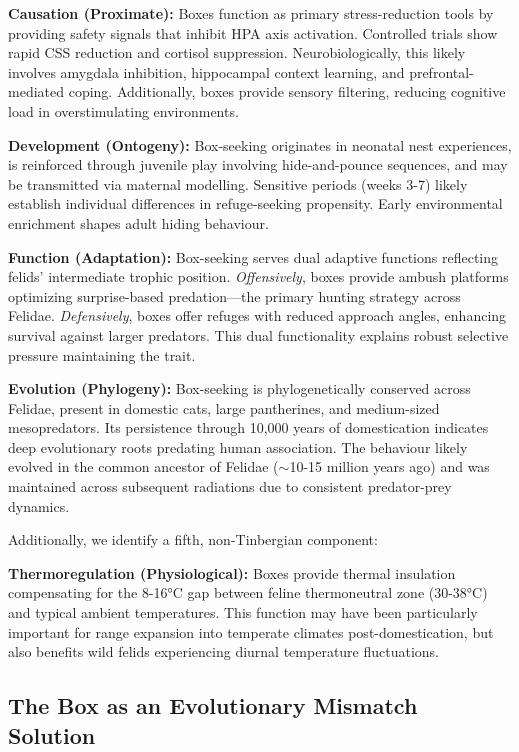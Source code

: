 \documentclass[12pt,a4paper]{article}
\begin{document}
\textbf{Causation (Proximate):} Boxes function as primary stress-reduction tools by providing safety signals that inhibit HPA axis activation. Controlled trials show rapid CSS reduction and cortisol suppression. Neurobiologically, this likely involves amygdala inhibition, hippocampal context learning, and prefrontal-mediated coping. Additionally, boxes provide sensory filtering, reducing cognitive load in overstimulating environments.

\textbf{Development (Ontogeny):} Box-seeking originates in neonatal nest experiences, is reinforced through juvenile play involving hide-and-pounce sequences, and may be transmitted via maternal modelling. Sensitive periods (weeks 3-7) likely establish individual differences in refuge-seeking propensity. Early environmental enrichment shapes adult hiding behaviour.

\textbf{Function (Adaptation):} Box-seeking serves dual adaptive functions reflecting felids' intermediate trophic position. \textit{Offensively}, boxes provide ambush platforms optimizing surprise-based predation—the primary hunting strategy across Felidae. \textit{Defensively}, boxes offer refuges with reduced approach angles, enhancing survival against larger predators. This dual functionality explains robust selective pressure maintaining the trait.

\textbf{Evolution (Phylogeny):} Box-seeking is phylogenetically conserved across Felidae, present in domestic cats, large pantherines, and medium-sized mesopredators. Its persistence through 10,000 years of domestication indicates deep evolutionary roots predating human association. The behaviour likely evolved in the common ancestor of Felidae ($\sim$10-15 million years ago) and was maintained across subsequent radiations due to consistent predator-prey dynamics.

Additionally, we identify a fifth, non-Tinbergian component:

\textbf{Thermoregulation (Physiological):} Boxes provide thermal insulation compensating for the 8-16°C gap between feline thermoneutral zone (30-38°C) and typical ambient temperatures. This function may have been particularly important for range expansion into temperate climates post-domestication, but also benefits wild felids experiencing diurnal temperature fluctuations.

\subsection{The Box as an Evolutionary Mismatch Solution}
\end{document}
